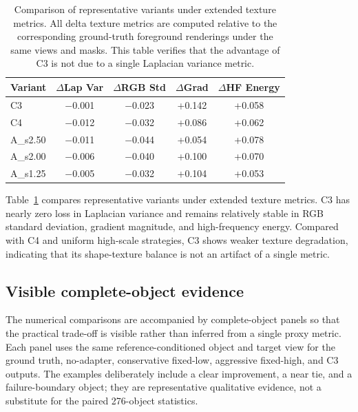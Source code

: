 \documentclass[times,twocolumn,final]{elsarticle}
\begin{document}
\FloatBarrier

\begin{table}[h!]
\centering
\caption{Comparison of representative variants under extended texture metrics. All delta texture metrics are computed relative to the corresponding ground-truth foreground renderings under the same views and masks. This table verifies that the advantage of C3 is not due to a single Laplacian variance metric.}
\label{tab:extended}
\small
\begin{tabular}{lcccc}
\toprule
Variant & $\Delta$Lap Var & $\Delta$RGB Std & $\Delta$Grad & $\Delta$HF Energy \\
\midrule
C3 & $-$0.001 & $-$0.023 & +0.142 & +0.058 \\
C4 & $-$0.012 & $-$0.032 & +0.086 & +0.062 \\
A\_s2.50 & $-$0.011 & $-$0.044 & +0.054 & +0.078 \\
A\_s2.00 & $-$0.006 & $-$0.040 & +0.100 & +0.070 \\
A\_s1.25 & $-$0.005 & $-$0.032 & +0.104 & +0.053 \\
\bottomrule
\end{tabular}
\end{table}

Table~\ref{tab:extended} compares representative variants under extended texture metrics. C3 has nearly zero loss in Laplacian variance and remains relatively stable in RGB standard deviation, gradient magnitude, and high-frequency energy. Compared with C4 and uniform high-scale strategies, C3 shows weaker texture degradation, indicating that its shape-texture balance is not an artifact of a single metric.

\FloatBarrier

\fi
\subsection{Visible complete-object evidence}
\label{subsec:visual}

The numerical comparisons are accompanied by complete-object panels so that
the practical trade-off is visible rather than inferred from a single proxy
metric. Each panel uses the same reference-conditioned object and target view
for the ground truth, no-adapter, conservative fixed-low, aggressive
fixed-high, and C3 outputs. The examples deliberately include a clear
improvement, a near tie, and a failure-boundary object; they are representative
qualitative evidence, not a substitute for the paired 276-object statistics.
\end{document}

